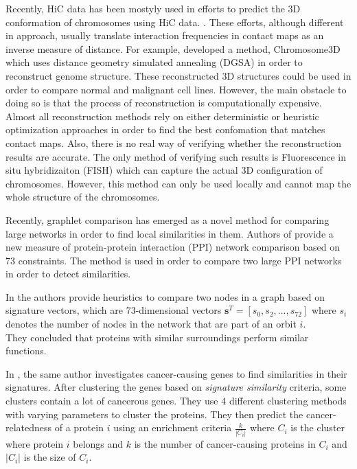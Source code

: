 \documentclass[a4,center,fleqn]{NAR}
\begin{document}
Recently, HiC data has been mostyly used
in efforts to predict the 3D conformation
of chromosomes using HiC data. 
\cite{noble2011three, 
rousseau2011three, 
hu2013bayesian, 
varoquaux2014statistical, 
trieu2014large, 
zhang20133d, 
lesne20143d, 
bau2011three, 
adhikari2016chromosome3d}.
These efforts, although different in
approach, usually translate 
interaction frequencies in contact maps as an inverse measure of 
distance. For example,  \cite{adhikari2016chromosome3d} developed
a method, Chromosome3D which uses
distance geometry simulated annealing (DGSA) in order to
reconstruct genome structure. These reconstructed 3D 
structures could be used in order to compare normal and malignant
cell lines. However, the main obstacle to doing so is that the
process of reconstruction is computationally
expensive. Almost all reconstruction methods rely on either 
deterministic or heuristic optimization approaches
in order to find the best
confomation that matches contact maps. Also, there is no real 
way of verifying whether the reconstruction results are accurate.
The only method of verifying such results is
Fluorescence in situ hybridizaiton
(FISH) which can capture the actual
3D configuration of chromosomes.
\cite{gasser2002visualizing, lanctot2007dynamic, mateos2009spatially}
However, this method can only be used locally and cannot map
the whole structure of the chromosomes.

Recently, graphlet comparison has emerged
as a novel method for comparing
large networks in order to
find local similarities in them.
Authors of \cite{prvzulj2007biological} 
provide a new measure of protein-protein
interaction (PPI)
network comparison
based on 73 constraints. The method
is used in order to compare two large
PPI networks in order to detect similarities.

In \cite{milenkoviae2008uncovering} the authors
 provide heuristics to compare two nodes in a graph
based on signature vectors, which are 73-dimensional vectors
$\mathbf{s}^T
= [s_0, s_2, ..., s_{72}]$ where $s_i$ denotes the number of nodes in
the network that are part of an orbit $i$. \\
They concluded that proteins with similar surroundings perform
similar functions.

In \cite{milenkovic2010cancer}, the same author investigates 
cancer-causing genes to find similarities in their signatures. After
clustering the genes based on \textit{signature similarity} criteria,
some clusters contain a lot of cancerous genes.
They use 4 different clustering methods with varying parameters to cluster
the proteins. They then predict the cancer-relatedness of a protein 
$i$ using
an enrichment criteria $\frac{k}{|C_i|}$ where $C_i$ is the cluster
where protein $i$ belongs and $k$ is the number of cancer-causing
proteins in $C_i$ and $|C_i|$ is the size of $C_i$.
\end{document}
